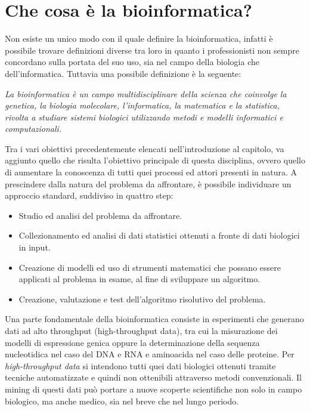 \section{Che cosa \`e la bioinformatica?}
Non esiste un unico modo con il quale definire la bioinformatica, infatti è possibile trovare definizioni diverse tra loro in quanto i professionisti non sempre concordano sulla portata del suo uso, sia nel campo della biologia che dell'informatica. Tuttavia una possibile definizione è la seguente:
\begin{center}
\textit{La bioinformatica è un campo multidisciplinare della scienza che coinvolge la genetica, la biologia molecolare, l'informatica, la matematica e la statistica, rivolta a studiare sistemi biologici utilizzando metodi e modelli informatici e computazionali.}
\end{center}
Tra i vari obiettivi precedentemente elencati nell'introduzione al capitolo, va aggiunto quello che risulta l'obiettivo principale di questa disciplina, ovvero quello di aumentare la conoscenza di tutti quei processi ed attori presenti in natura.
\newline
A prescindere dalla natura del problema da affrontare, è possibile individuare un approccio standard, suddiviso in quattro step:
\begin{itemize}
	\item Studio ed analisi del problema da affrontare.
	\item Collezionamento ed analisi di dati statistici ottenuti a fronte di dati biologici in input.
	\item Creazione di modelli ed uso di strumenti matematici che possano essere applicati al problema in esame, al fine di sviluppare un algoritmo.
	\item Creazione, valutazione e test dell'algoritmo risolutivo del problema.
\end{itemize}
Una parte fondamentale della bioinformatica consiste in esperimenti che generano dati ad alto throughput (high-throughput data), tra cui la misurazione dei modelli di espressione genica oppure la determinazione della sequenza nucleotidica nel caso del DNA e RNA e aminoacida nel caso delle proteine. Per \textit{high-throughput data} si intendono tutti quei dati biologici ottenuti tramite tecniche automatizzate e quindi non ottenibili attraverso metodi convenzionali.
Il mining di questi dati può portare a nuove scoperte scientifiche non solo in campo biologico, ma anche medico, sia nel breve che nel lungo periodo.
\newline
